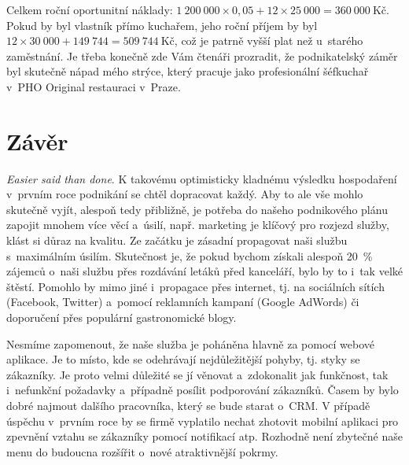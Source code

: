 Celkem roční oportunitní náklady: $1~200~000 \times 0,05 + 12 \times 25~000 = 360~000~\text{Kč}$. Pokud by byl vlastník přímo kuchařem, jeho roční příjem by byl $12 \times 30~000 + 149~744 = 509~744~\text{Kč}$, což je patrně vyšší plat než u~starého zaměstnání. Je třeba konečně zde Vám čtenáři prozradit, že podnikatelský záměr byl skutečně nápad mého strýce, který pracuje jako profesionální šéfkuchař v~PHO Original restauraci v~Praze.





\section*{Závěr}
\textit{Easier said than done}. K takovému optimisticky kladnému výsledku hospodaření v~prvním roce podnikání se chtěl dopracovat každý. Aby to ale vše mohlo skutečně vyjít, alespoň tedy přibližně, je potřeba do našeho podnikového plánu zapojit mnohem více věcí a~úsilí, např. marketing je klíčový pro rozjezd služby, klást si důraz na kvalitu. Ze začátku je zásadní propagovat naši službu s~maximálním úsilím. Skutečnost je, že pokud bychom získali alespoň 20~\% zájemců o~naši službu přes rozdávání letáků před kanceláří, bylo by to i~tak velké štěstí. Pomohlo by mimo jiné i~propagace přes internet, tj. na sociálních sítích (Facebook, Twitter) a~pomocí reklamních kampaní (Google AdWords) či doporučení přes populární gastronomické blogy.

Nesmíme zapomenout, že naše služba je poháněna hlavně za pomocí webové aplikace. Je to místo, kde se odehrávají nejdůležitější pohyby, tj. styky se zákazníky. Je proto velmi důležité se jí věnovat a~zdokonalit jak funkčnost, tak i~nefunkční požadavky a~případně posílit podporování zákazníků. Časem by bylo dobré najmout dalšího pracovníka, který se bude starat o~CRM. V případě úspěchu v~prvním roce by se firmě vyplatilo nechat zhotovit mobilní aplikaci pro zpevnění vztahu se zákazníky pomocí notifikací atp. Rozhodně není zbytečné naše menu do budoucna rozšířit o~nové atraktivnější pokrmy.